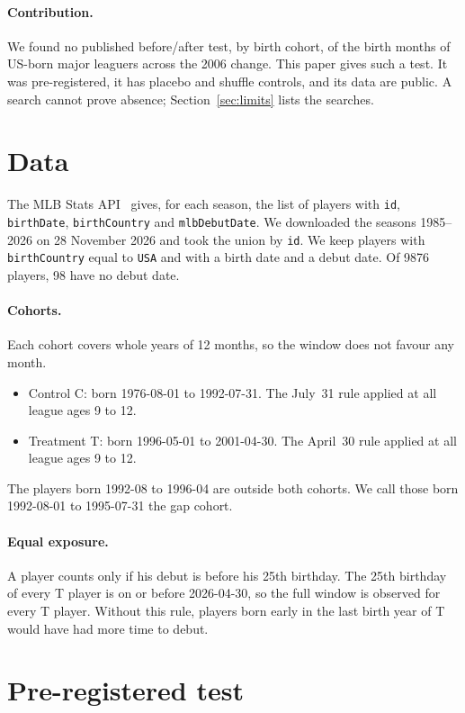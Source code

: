 \documentclass[11pt]{article}
\begin{document}
\paragraph{Contribution.}
We found no published before/after test, by birth cohort, of the birth months of US-born major leaguers across the 2006 change. This paper gives such a test. It was pre-registered, it has placebo and shuffle controls, and its data are public. A search cannot prove absence; Section~\ref{sec:limits} lists the searches.

\section{Data}

The MLB Stats API~\cite{statsapi} gives, for each season, the list of players with \texttt{id}, \texttt{birthDate}, \texttt{birthCountry} and \texttt{mlbDebutDate}. We downloaded the seasons 1985--2026 on 28 November 2026 and took the union by \texttt{id}. We keep players with \texttt{birthCountry} equal to \texttt{USA} and with a birth date and a debut date. Of 9876 players, 98 have no debut date.

\paragraph{Cohorts.} Each cohort covers whole years of 12 months, so the window does not favour any month.
\begin{itemize}
\item Control C: born 1976-08-01 to 1992-07-31. The July~31 rule applied at all league ages 9 to 12.
\item Treatment T: born 1996-05-01 to 2001-04-30. The April~30 rule applied at all league ages 9 to 12.
\end{itemize}
The players born 1992-08 to 1996-04 are outside both cohorts. We call those born 1992-08-01 to 1995-07-31 the gap cohort.

\paragraph{Equal exposure.} A player counts only if his debut is before his 25th birthday. The 25th birthday of every T player is on or before 2026-04-30, so the full window is observed for every T player. Without this rule, players born early in the last birth year of T would have had more time to debut.

\section{Pre-registered test}
\end{document}
